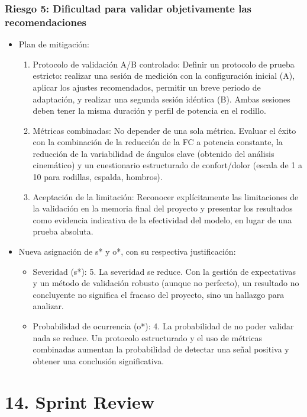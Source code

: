 \documentclass[
11pt, %
]{charter}
\begin{document}
\subsubsection*{Riesgo 5: Dificultad para validar objetivamente las recomendaciones}
\begin{itemize}
    \item Plan de mitigación:
    \begin{enumerate}
        \item Protocolo de validación A/B controlado: Definir un protocolo de prueba estricto: realizar una sesión de medición con la configuración inicial (A), aplicar los ajustes recomendados, permitir un breve periodo de adaptación, y realizar una segunda sesión idéntica (B). Ambas sesiones deben tener la misma duración y perfil de potencia en el rodillo.
        \item Métricas combinadas: No depender de una sola métrica. Evaluar el éxito con la combinación de la reducción de la FC a potencia constante, la reducción de la variabilidad de ángulos clave (obtenido del análisis cinemático) y un cuestionario estructurado de confort/dolor (escala de 1 a 10 para rodillas, espalda, hombros).
        \item Aceptación de la limitación: Reconocer explícitamente las limitaciones de la validación en la memoria final del proyecto y presentar los resultados como evidencia indicativa de la efectividad del modelo, en lugar de una prueba absoluta.
    \end{enumerate}
    \item Nueva asignación de s* y o*, con su respectiva justificación:
    \begin{itemize}
        \item Severidad (s*): 5. La severidad se reduce. Con la gestión de expectativas y un método de validación robusto (aunque no perfecto), un resultado no concluyente no significa el fracaso del proyecto, sino un hallazgo para analizar.
        \item Probabilidad de ocurrencia (o*): 4. La probabilidad de no poder validar nada se reduce. Un protocolo estructurado y el uso de métricas combinadas aumentan la probabilidad de detectar una señal positiva y obtener una conclusión significativa.
    \end{itemize}
\end{itemize}

\section{14. Sprint Review}
\label{sec:sprint_review}
\end{document}

